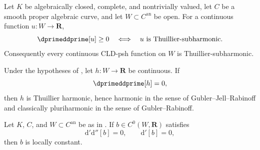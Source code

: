 
\begin{theorem}
\label{thm:wanner-curve-comparison}
Let \(K\) be algebraically closed, complete, and nontrivially valued, let
\(C\) be a smooth proper algebraic curve, and let \(W\subset C^{\mathrm{an}}\)
be open.  For a continuous function \(u:W\to\mathbf R\),
\[
                  \dprimeddprime[u]\geq0
        \quad\Longleftrightarrow\quad
                  u\text{ is Thuillier-subharmonic}.
\]
Consequently every continuous CLD-psh function on \(W\) is
Thuillier-subharmonic.
\end{theorem}

\begin{corollary}
\label{cor:ch19-continuous-zero-current-harmonic}
Under the hypotheses of , let
$h:W\to\mathbf R$ be continuous.  If
\[
                         \dprimeddprime[h]=0,
\]
then $h$ is Thuillier harmonic, hence harmonic in the sense of
Gubler--Jell--Rabinoff and classically pluriharmonic in the sense of
Gubler--Rabinoff.
\end{corollary}

\begin{lemma}
\label{lem:p062-curve-first-current-rigidity}
Let \(K\), \(C\), and \(W\subset C^{\mathrm{an}}\) be as in
.  If \(b\in C^0(W,\mathbf R)\) satisfies
\[
          \mathrm d'\mathrm d''[b]=0,\qquad \mathrm d'[b]=0,
\]
then \(b\) is locally constant.
\end{lemma}

